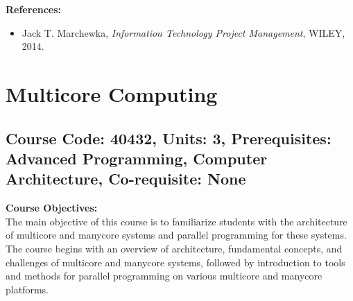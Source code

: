 \documentclass[12pt]{article}
\begin{document}
\textbf{References:}
\begin{itemize}
    \item Jack T. Marchewka, \textit{Information Technology Project Management}, WILEY, 2014.
\end{itemize}

\newpage

\section{Multicore Computing}
\subsection*{Course Code: 40432, Units: 3, Prerequisites: Advanced Programming, Computer Architecture, Co-requisite: None}

\textbf{Course Objectives:} \\
The main objective of this course is to familiarize students with the architecture of multicore and manycore systems and parallel programming for these systems. The course begins with an overview of architecture, fundamental concepts, and challenges of multicore and manycore systems, followed by introduction to tools and methods for parallel programming on various multicore and manycore platforms.
\end{document}
